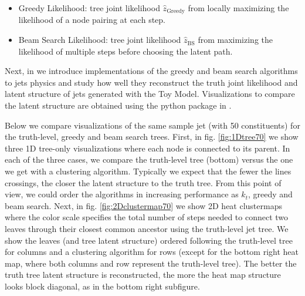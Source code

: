 \documentclass[12pt]{article}
\begin{document}
\begin{itemize}
\item Greedy Likelihood: tree joint likelihood $\hat{z}_{\text{Greedy}}$ from locally maximizing the likelihood of a node pairing at each step.  

\item Beam Search Likelihood: tree joint likelihood $\hat{z}_{\text{BS}}$ from maximizing the likelihood of multiple steps before choosing the latent path.

\end{itemize}

 
Next, in \cite{TreeAlgorithms} we introduce implementations of the greedy and beam search algorithms to jets physics and study how well they reconstruct the truth joint likelihood and latent structure of jets generated with the Toy Model. Visualizations to compare the latent structure are obtained using the python package in \cite{VisualizeBinaryTrees}.


Below we compare visualizations of the same sample jet (with 50 constituents) for the truth-level, greedy and beam search trees. First, in fig. \ref{fig:1Dtree70} we show three 1D tree-only visualizations where each node is connected to its parent. In each of the three cases, we compare the truth-level tree (bottom) versus the one we get with a clustering algorithm. Typically we expect that the fewer the lines crossings, the closer the latent structure to the truth tree. From this point of view, we could order the algorithms in increasing performance as $k_t$, greedy and beam search.
Next, in fig. \ref{fig:2Dclustermap70} we show 2D heat clustermaps where the color scale specifies the total number of steps needed to connect two leaves through their closest common ancestor using the truth-level jet tree. We show the leaves (and tree latent structure) ordered following the truth-level tree for columns and a clustering algorithm for rows (except for the bottom right heat map, where both columns and row represent the truth-level tree). The better the truth tree latent structure is reconstructed, the more the heat map structure looks block diagonal, as in the bottom right subfigure.
 
\end{document}
